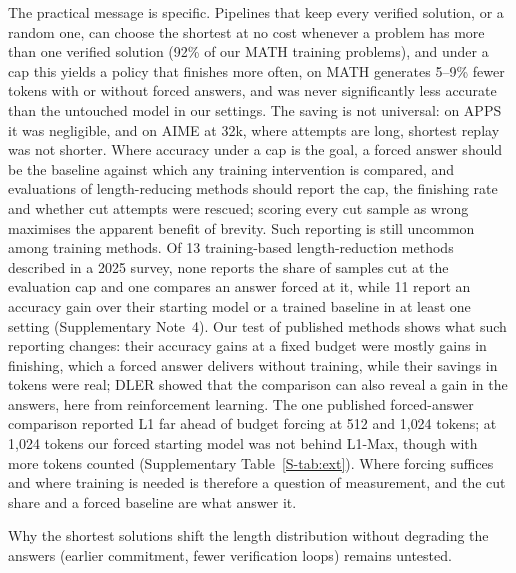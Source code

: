 \documentclass[10pt]{article}
\newcommand{\sref}[1]{\ref{S-#1}}
\begin{document}
The practical message is specific. Pipelines that keep every verified solution, or a random one\cite{zelikman2022star,yuan2023rft,gulcehre2023rest}, can choose the shortest at no cost whenever a problem has more than one verified solution (92\% of our MATH training problems), and under a cap this yields a policy that finishes more often, on MATH generates 5--9\% fewer tokens with or without forced answers, and was never significantly less accurate than the untouched model in our settings. The saving is not universal: on APPS it was negligible, and on AIME at 32k, where attempts are long, shortest replay was not shorter. Where accuracy under a cap is the goal, a forced answer should be the baseline against which any training intervention is compared, and evaluations of length-reducing methods should report the cap, the finishing rate and whether cut attempts were rescued; scoring every cut sample as wrong maximises the apparent benefit of brevity. Such reporting is still uncommon among training methods. Of 13 training-based length-reduction methods described in a 2025 survey\cite{sui2025stopoverthinking}, none reports the share of samples cut at the evaluation cap and one compares an answer forced at it, while 11 report an accuracy gain over their starting model or a trained baseline in at least one setting (Supplementary Note~4). Our test of published methods shows what such reporting changes: their accuracy gains at a fixed budget were mostly gains in finishing, which a forced answer delivers without training, while their savings in tokens were real; DLER showed that the comparison can also reveal a gain in the answers, here from reinforcement learning. The one published forced-answer comparison reported L1 far ahead of budget forcing at 512 and 1{,}024 tokens\cite{aggarwal2025l1}; at 1{,}024 tokens our forced starting model was not behind L1-Max, though with more tokens counted (Supplementary Table~\sref{tab:ext}). Where forcing suffices and where training is needed is therefore a question of measurement, and the cut share and a forced baseline are what answer it.

Why the shortest solutions shift the length distribution without degrading the answers (earlier commitment, fewer verification loops) remains untested.
\end{document}
